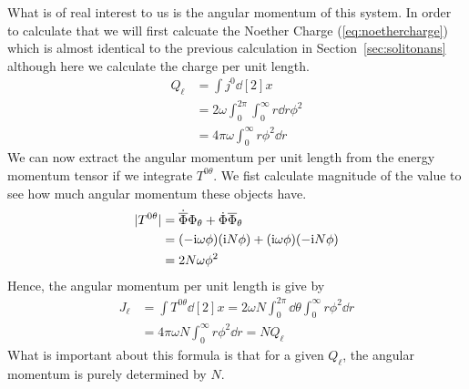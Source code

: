 What is of real interest to us is the angular momentum of this system. In order
to calculate that we will first calcuate the Noether Charge
(\ref{eq:noethercharge}) which is almost identical to the previous calculation
in Section~\ref{sec:solitonans} although here we calculate the charge per unit
length.
\begin{align}
    Q_\ell & = \int j^0\dd[2]{x} \\
           & = 2\omega \int_0^{2\pi}\int_0^\infty r\dd{r}\phi^2 \\
           & = 4\pi\omega \int_0^\infty r\phi^2 \dd{r} \label{eq:spincharge}
\end{align}
We can now extract the angular momentum per unit length from the energy momentum
tensor if we integrate \(T^{0\theta}\). We fist calculate magnitude of the value
to see how much angular momentum these objects have.
\begin{align}
    |T^{0\theta}| & = \dot{\overline{\Phi}}\Phi_\theta + \dot{\Phi}\overline{\Phi}_\theta \\
                  & = (-\mathrm{i}\omega\phi)(\mathrm{i} N\phi) + (\mathrm{i}\omega\phi)(-\mathrm{i} N\phi) \\
                  & = 2N\omega\phi^2
\end{align}
Hence, the angular momentum per unit length is give by
\begin{align}
    J_\ell & = \int T^{0\theta}\dd[2]{x} = 2\omega N\int_0^{2\pi}\dd{\theta}\int_0^\infty r\phi^2\dd{r} \\
           & = 4\pi\omega N\int_0^\infty r\phi^2\dd{r} = NQ_\ell
\end{align}
What is important about this formula is that for a given \(Q_\ell\), the angular
momentum is purely determined by \(N\).

